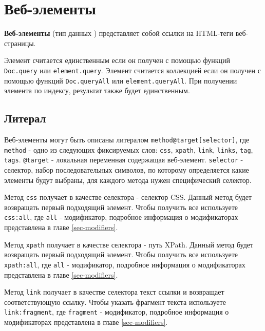 \section{Веб-элементы}
\label{webelments}

{\bf Веб-элементы} (тип данных \element) представляет собой ссылки на HTML-теги веб-страницы.

Элемент считается единственным если он получен с помощью функций \texttt{Doc.query} или \texttt{element.query}. Элемент считается коллекцией если он получен с помощью функций \texttt{Doc.queryAll} или \texttt{element.queryAll}. При получении элемента по индексу, результат также будет единственным.

\subsection{Литерал}

Веб-элементы могут быть описаны литералом \texttt{method@target[selector]}, где \texttt{method} - одно из следующих фиксируемых слов: \texttt{css}, \texttt{xpath}, \texttt{link}, \texttt{links}, \texttt{tag}, \texttt{tags}. \texttt{@target} - локальная переменная содержащая веб-элемент. \texttt{selector} - селектор, набор последовательных символов, по которому определяется какие элементы будут выбраны, для каждого метода нужен специфический селектор.

Метод \texttt{css} получает в качестве селектора - селектор CSS. Данный метод будет возвращать первый подходящий элемент. Чтобы получить все используете \texttt{css:all}, где \texttt{all} - модификатор, подробное информация о модификаторах представлена в главе \ref{sec-modifiers}.

Метод \texttt{xpath} получает в качестве селектора - путь XPath. Данный метод будет возвращать первый подходящий элемент. Чтобы получить все используете \texttt{xpath:all}, где \texttt{all} - модификатор, подробное информация о модификаторах представлена в главе \ref{sec-modifiers}.

Метод \texttt{link} получает в качестве селектора текст ссылки и возвращает соответствующую ссылку. Чтобы указать фрагмент текста используете \texttt{link:fragment}, где \texttt{fragment} - модификатор, подробное информация о модификаторах представлена в главе \ref{sec-modifiers}.

